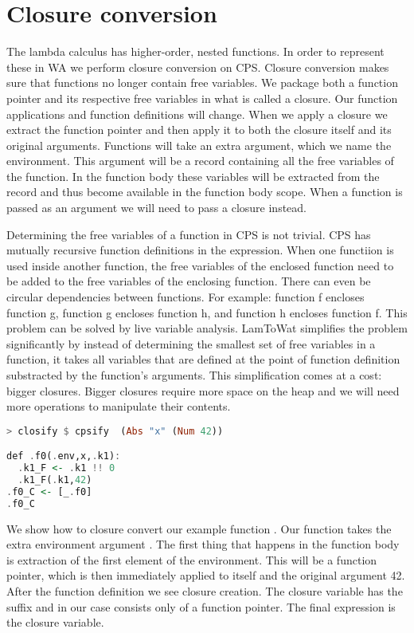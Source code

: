 \section{\label{section:closconvert}Closure conversion}
The lambda calculus has higher-order, nested functions. In order to represent these in \ac{WA} we perform closure conversion on \ac{CPS}. Closure conversion makes sure that functions no longer contain free variables. We package both a function pointer and its respective free variables in what is called a closure. Our function applications and function definitions will change. When we apply a closure we extract the function pointer and then apply it to both the closure itself and its original arguments. Functions will take an extra argument, which we name the environment. This argument will be a record containing all the free variables of the function. In the function body these variables will be extracted from the record and thus become available in the function body scope. When a function is passed as an argument we will need to pass a closure instead.

Determining the free variables of a function in \ac{CPS} is not trivial. \ac{CPS} has mutually recursive function definitions in the  expression. When one functiion is used inside another function, the free variables of the enclosed function need to be added to the free variables of the enclosing function. There can even be circular dependencies between functions. For example: function f encloses function g, function g encloses function h, and function h encloses function f. This problem can be solved by live variable analysis\autocite{DBLP:books/aw/AhoSU86}. LamToWat simplifies the problem significantly by instead of determining the smallest set of free variables in a function, it takes all variables that are defined at the point of function definition substracted by the function's arguments. This simplification comes at a cost: bigger closures. Bigger closures require more space on the heap and we will need more operations to manipulate their contents.

\begin{lstlisting}[language=Haskell]
> closify $ cpsify  (Abs "x" (Num 42))

def .f0(.env,x,.k1):
  .k1_F <- .k1 !! 0
  .k1_F(.k1,42)
.f0_C <- [_.f0]
.f0_C
\end{lstlisting}

We show how to closure convert our example function . Our function  takes the extra environment argument . The first thing that happens in the function body is extraction of the first element of the environment. This will be a function pointer, which is then immediately applied to itself and the original argument 42. After the function definition we see closure creation. The closure variable has the  suffix and in our case consists only of a function pointer. The final expression is the closure variable.

